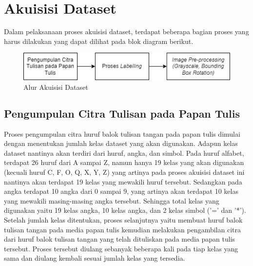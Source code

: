 
\section{Akuisisi Dataset}
\label{sec:akuisisidataset}

Dalam pelaksanaan proses akuisisi dataset, terdapat beberapa bagian proses yang harus dilakukan yang dapat dilihat pada blok diagram berikut.


\begin{figure}[ht]
    \centering
    \includegraphics[scale=0.9]{gambar/metodologi_akuisisi_data.png}
    \caption{Alur Akuisisi Dataset}
    \label{fig:alurakuisisidataset}
\end{figure}

\subsection{Pengumpulan Citra Tulisan pada Papan Tulis}
\label{subsec:pengumpulancitra}

Proses pengumpulan citra huruf balok tulisan tangan pada papan tulis dimulai dengan menentukan jumlah kelas dataset yang akan digunakan. Adapun kelas dataset nantinya akan terdiri dari huruf, angka, dan simbol. Pada huruf alfabet, terdapat 26 huruf dari A sampai Z, namun hanya 19 kelas yang akan digunakan (kecuali huruf C, F, O, Q, X, Y, Z) yang artinya pada proses akuisisi dataset ini nantinya akan terdapat 19 kelas yang mewakili huruf tersebut. Sedangkan pada angka terdapat 10 angka dari 0 sampai 9, yang artinya akan terdapat 10 kelas yang mewakili masing-masing angka tersebut. Sehingga total kelas yang digunakan yaitu 19 kelas angka, 10 kelas angka, dan 2 kelas simbol ('=' dan '*'). Setelah jumlah kelas ditentukan, proses selanjutnya yaitu membuat huruf balok tulisan tangan pada media papan tulis kemudian melakukan pengambilan citra dari huruf balok tulisan tangan yang telah dituliskan pada media papan tulis tersebut. Proses tersebut diulang sebanyak beberapa kali pada tiap kelas yang sama dan diulang kembali sesuai jumlah kelas yang tersedia. \par

